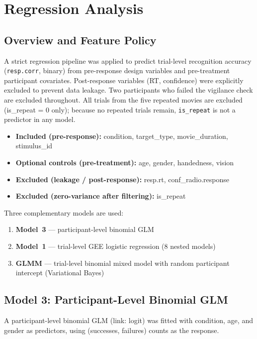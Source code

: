 \documentclass[12pt,a4paper]{article}
\begin{document}
\section{Regression Analysis}

\subsection{Overview and Feature Policy}
A strict regression pipeline was applied to predict trial-level recognition accuracy
(\texttt{resp.corr}, binary) from pre-response design variables and pre-treatment participant
covariates. Post-response variables (RT, confidence) were explicitly excluded to prevent data
leakage. Two participants who failed the vigilance check are excluded throughout. All trials
from the five repeated movies are excluded (is\_repeat = 0 only); because no repeated trials
remain, \texttt{is\_repeat} is not a predictor in any model.

\begin{itemize}[nosep]
  \item \textbf{Included (pre-response):} condition, target\_type, movie\_duration, stimulus\_id
  \item \textbf{Optional controls (pre-treatment):} age, gender, handedness, vision
  \item \textbf{Excluded (leakage / post-response):} resp.rt, conf\_radio.response
  \item \textbf{Excluded (zero-variance after filtering):} is\_repeat
\end{itemize}

Three complementary models are used:
\begin{enumerate}[nosep]
  \item \textbf{Model~3} --- participant-level binomial GLM
  \item \textbf{Model~1} --- trial-level GEE logistic regression (8 nested models)
  \item \textbf{GLMM}    --- trial-level binomial mixed model with random participant intercept (Variational Bayes)
\end{enumerate}

\subsection{Model 3: Participant-Level Binomial GLM}
A participant-level binomial GLM (link: logit) was fitted with condition, age, and gender as
predictors, using (successes, failures) counts as the response.
\end{document}
